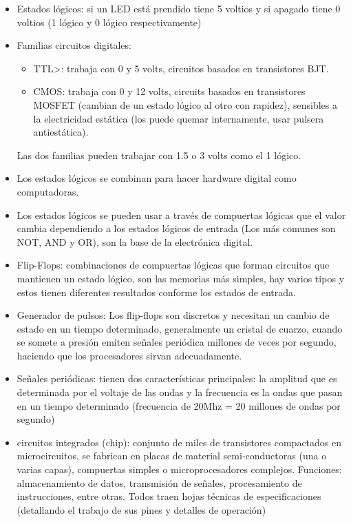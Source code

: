 \documentclass[stu, 12pt, letterpaper, donotrepeattitle, floatsintext, natbib, helv]{apa7}
\begin{document}
\begin{itemize}
\begin{itemize}
        \item Estados lógicos: si un LED está prendido tiene 5 voltios y si apagado tiene 0 voltios (1 lógico y 0 lógico respectivamente)
        \item Familias circuitos digitales:
        \begin{itemize}
            \item TTL>: trabaja con 0 y 5 volts, circuitos basados en transistores BJT.
            \item CMOS: trabaja con 0 y 12 volts, circuits basados en transistores MOSFET (cambian de un estado lógico al otro con rapidez), sensibles a la electricidad estática (los puede quemar internamente, usar pulsera antiestática).
        \end{itemize}
        Las dos familias pueden trabajar con 1.5 o 3 volts como el 1 lógico.
        \item Los estados lógicos se combinan para hacer hardware digital como computadoras.
        \item Los estados lógicos se pueden usar a través de compuertas lógicas que el valor cambia dependiendo a los estados lógicos de entrada (Los más comunes son NOT, AND y OR), son la base de la electrónica digital.
        \item Flip-Flops: combinaciones de compuertas lógicas que forman circuitos que mantienen un estado lógico, son las memorias más simples, hay varios tipos y estos tienen diferentes resultados conforme los estados de entrada.
        \item Generador de pulsos: Los flip-flops son discretos y necesitan un cambio de estado en un tiempo determinado, generalmente un cristal de cuarzo, cuando se somete a presión emiten señales periódica millones de veces por segundo, haciendo que los procesadores sirvan adecuadamente.
        \item Señales periódicas: tienen dos características principales: la amplitud que es determinada por el voltaje de las ondas y la frecuencia es la ondas que pasan en un tiempo determinado (frecuencia de 20Mhz = 20 millones de ondas por segundo)
        \item circuitos integrados (chip): conjunto de miles de transistores compactados en microcircuitos, se fabrican en placas de material semi-conductoras (una o varias capas), compuertas simples o microprocesadores complejos. Funciones: almacenamiento de datos, transmisión de señales, procesamiento de instrucciones, entre otras. Todos traen hojas técnicas de especificaciones (detallando el trabajo de sus pines y detalles de operación)
    \end{itemize}
\end{itemize}
\end{document}
